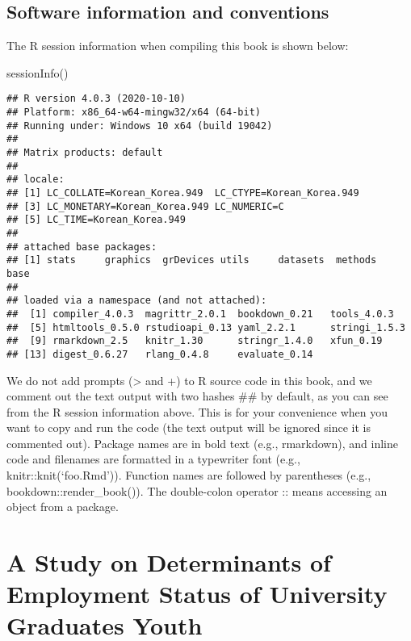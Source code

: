 \documentclass[
]{book}
\newenvironment{Shaded}{\begin{snugshade}}{\end{snugshade}}
\newcommand{\FunctionTok}[1]{\textcolor[rgb]{0.00,0.00,0.00}{#1}}
\newcommand{\NormalTok}[1]{#1}
\begin{document}
\hypertarget{software-information-and-conventions}{%
\section*{Software information and conventions}\label{software-information-and-conventions}}

The R session information when compiling this book is shown below:

\begin{Shaded}
\begin{Highlighting}[]
\FunctionTok{sessionInfo}\NormalTok{()}
\end{Highlighting}
\end{Shaded}

\begin{verbatim}
## R version 4.0.3 (2020-10-10)
## Platform: x86_64-w64-mingw32/x64 (64-bit)
## Running under: Windows 10 x64 (build 19042)
## 
## Matrix products: default
## 
## locale:
## [1] LC_COLLATE=Korean_Korea.949  LC_CTYPE=Korean_Korea.949   
## [3] LC_MONETARY=Korean_Korea.949 LC_NUMERIC=C                
## [5] LC_TIME=Korean_Korea.949    
## 
## attached base packages:
## [1] stats     graphics  grDevices utils     datasets  methods   base     
## 
## loaded via a namespace (and not attached):
##  [1] compiler_4.0.3  magrittr_2.0.1  bookdown_0.21   tools_4.0.3    
##  [5] htmltools_0.5.0 rstudioapi_0.13 yaml_2.2.1      stringi_1.5.3  
##  [9] rmarkdown_2.5   knitr_1.30      stringr_1.4.0   xfun_0.19      
## [13] digest_0.6.27   rlang_0.4.8     evaluate_0.14
\end{verbatim}

We do not add prompts (\textgreater{} and +) to R source code in this book, and we comment out the text output with two hashes \#\# by default, as you can see from the R session information above. This is for your convenience when you want to copy and run the code (the text output will be ignored since it is commented out). Package names are in bold text (e.g., rmarkdown), and inline code and filenames are formatted in a typewriter font (e.g., knitr::knit(`foo.Rmd')). Function names are followed by parentheses (e.g., bookdown::render\_book()). The double-colon operator :: means accessing an object from a package.

\hypertarget{a-study-on-determinants-of-employment-status-of-university-graduates-youth}{%
\chapter{A Study on Determinants of Employment Status of University Graduates Youth}\label{a-study-on-determinants-of-employment-status-of-university-graduates-youth}}
\end{document}
